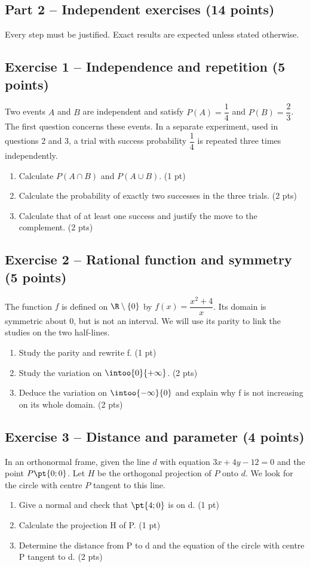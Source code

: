 \mxnewpage\subsection*{Part 2 -- Independent exercises (14 points)}
Every step must be justified. Exact results are expected unless stated otherwise.
\subsection*{Exercise 1 -- Independence and repetition (5 points)}
Two events $A$ and $B$ are independent and satisfy $P(A)=\dfrac14$ and $P(B)=\dfrac23$. The first question concerns these events. In a separate experiment, used in questions 2 and 3, a trial with success probability $\dfrac14$ is repeated three times independently.
\begin{enumerate}
\item Calculate $P(A\cap B)$ and $P(A\cup B)$. \hfill(1 pt)
\item Calculate the probability of exactly two successes in the three trials. \hfill(2 pts)
\item Calculate that of at least one success and justify the move to the complement. \hfill(2 pts)
\end{enumerate}
\subsection*{Exercise 2 -- Rational function and symmetry (5 points)}
The function $f$ is defined on $\R\setminus\{0\}$ by $f(x)=\dfrac{x^2+4}{x}$. Its domain is symmetric about 0, but is not an interval. We will use its parity to link the studies on the two half-lines.
\begin{enumerate}
\item Study the parity and rewrite f. \hfill(1 pt)
\item Study the variation on $\intoo{0}{+\infty}$. \hfill(2 pts)
\item Deduce the variation on $\intoo{-\infty}{0}$ and explain why f is not increasing on its whole domain. \hfill(2 pts)
\end{enumerate}
\subsection*{Exercise 3 -- Distance and parameter (4 points)}
In an orthonormal frame, given the line $d$ with equation $3x+4y-12=0$ and the point $P\pt{0;0}$. Let $H$ be the orthogonal projection of $P$ onto $d$. We look for the circle with centre $P$ tangent to this line.
\begin{enumerate}
\item Give a normal and check that $\pt{4;0}$ is on d. \hfill(1 pt)
\item Calculate the projection H of P. \hfill(1 pt)
\item Determine the distance from P to d and the equation of the circle with centre P tangent to d. \hfill(2 pts)
\end{enumerate}
